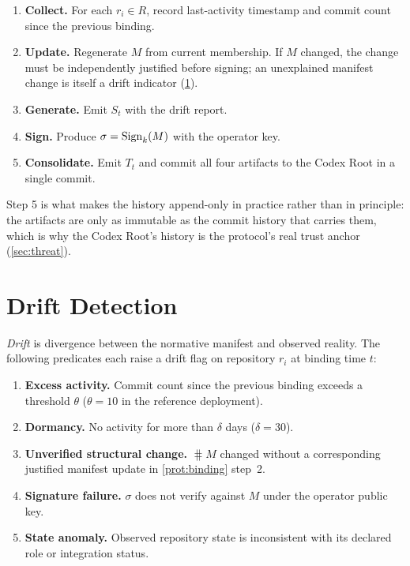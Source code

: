 \documentclass[11pt,a4paper]{article}
\begin{document}
\begin{protocol}
\label{prot:binding}
\begin{enumerate}[leftmargin=2.4em]
  \item \textbf{Collect.} For each $r_i \in R$, record last-activity
        timestamp and commit count since the previous binding.
  \item \textbf{Update.} Regenerate $M$ from current membership. If $M$
        changed, the change must be independently justified before signing;
        an unexplained manifest change is itself a drift indicator
        (\cref{sec:drift}).
  \item \textbf{Generate.} Emit $S_t$ with the drift report.
  \item \textbf{Sign.} Produce $\sigma = \sign{M}{k}$ with the operator key.
  \item \textbf{Consolidate.} Emit $T_t$ and commit all four artifacts to the
        Codex Root in a single commit.
\end{enumerate}
\end{protocol}

Step 5 is what makes the history append-only in practice rather than in
principle: the artifacts are only as immutable as the commit history that
carries them, which is why the Codex Root's history is the protocol's real
trust anchor (\cref{sec:threat}).

\section{Drift Detection}
\label{sec:drift}

\emph{Drift} is divergence between the normative manifest and observed
reality. The following predicates each raise a drift flag on repository
$r_i$ at binding time $t$:

\begin{enumerate}[label=D\arabic*.,leftmargin=2.6em]
  \item \textbf{Excess activity.} Commit count since the previous binding
        exceeds a threshold $\theta$ ($\theta = 10$ in the reference
        deployment).
  \item \textbf{Dormancy.} No activity for more than $\delta$ days
        ($\delta = 30$).
  \item \textbf{Unverified structural change.} $\hash{M}$ changed without a
        corresponding justified manifest update in \cref{prot:binding}
        step~2.
  \item \textbf{Signature failure.} $\sigma$ does not verify against $M$
        under the operator public key.
  \item \textbf{State anomaly.} Observed repository state is inconsistent
        with its declared role or integration status.
\end{enumerate}
\end{document}
